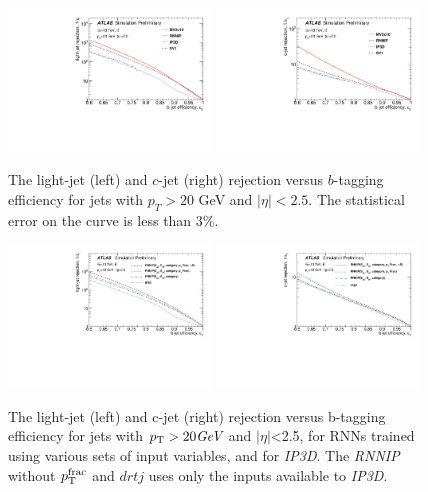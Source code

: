 \begin{figure}[htbp]
  \centering
 \includegraphics[width=0.48\textwidth]{figures/RNN/BL_ROC.pdf}
 \includegraphics[width=0.48\textwidth]{figures/RNN//BC_ROC.pdf}
\caption{The light-jet (left) and $c$-jet (right) rejection versus $b$-tagging efficiency for jets with $p_T > 20$ GeV and $|\eta|<2.5$. The statistical error on the curve is less than 3\%.}
  \label{fig:ROC}
\end{figure}

\begin{figure}[htbp]
  \centering
 \includegraphics[width=0.48\textwidth]{figures/RNN/BL_ROC_RNNComp.pdf}
 \includegraphics[width=0.48\textwidth]{figures/RNN//BC_ROC_RNNComp.pdf}
 \caption{The light-jet (left) and c-jet (right) rejection versus b-tagging efficiency for jets with $p_{{\rm T}} > 20 \textit{GeV}$ and $|\eta|$<2.5, for RNNs trained using various sets of input variables, and for \textit{IP3D}. The \textit{RNNIP} without $p_{\rm T}^{\rm frac}$ and $drtj$ uses only the inputs available to \textit{IP3D}.}
  \label{fig:IP3D-RNN}
\end{figure}


